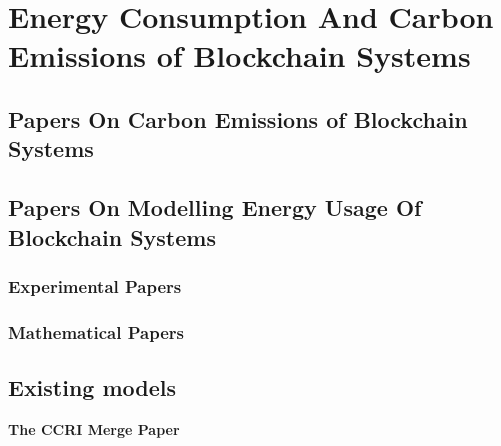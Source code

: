 \section{Energy Consumption And Carbon Emissions of Blockchain Systems}




\subsection{Papers On Carbon Emissions of Blockchain Systems}



\subsection{Papers On Modelling Energy Usage Of Blockchain Systems}



\subsubsection{Experimental Papers}




\subsubsection{Mathematical Papers}



\subsection{ Existing models }
\label{LitRevExistingModels}
\textbf{The CCRI Merge Paper } \cite{CryptoCarbonRatingsInstitute2022TheNetwork}

